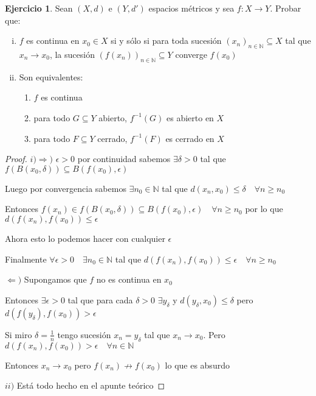 \documentclass[12pt]{article}
\newcommand{\N}{\mathbb{N}}
\newcommand{\Ra}{\Rightarrow}
\newcommand{\ra}{\rightarrow}
\theoremstyle{definition}
\newtheorem{ej}{Ejercicio}
\begin{document}
\begin{ej}
  Sean $(X,d)$ e $(Y,d')$ espacios métricos y sea $f: X \ra Y$. Probar que:
  \begin{enumerate}[i.]
    \item $f$ es continua en $x_0 \in X$ si y sólo si para toda sucesión $(x_n)_{n \in \N} \subseteq X$ tal que $x_n \ra x_0$, la sucesión $(f(x_n))_{n \in \N} \subseteq Y$ converge $f(x_0)$
    \item Son equivalentes:
      \begin{enumerate}
	\item $f$ es continua
	\item para todo $G \subseteq Y$ abierto, $f^{-1}(G)$ es abierto en $X$
	\item para todo $F \subseteq Y$ cerrado, $f^{-1}(F)$ es cerrado en $X$
      \end{enumerate}
  \end{enumerate}
  \begin{proof}
$i) \Ra)$ $\epsilon >0$ por continuidad sabemos $\exists \delta >0$ tal que $f(B(x_0,\delta)) \subseteq B(f(x_0),\epsilon)$

  Luego por convergencia sabemos $\exists n_0 \in \N$ tal que $d(x_n,x_0) \leq \delta \quad \forall n \geq n_0$ 

  Entonces $f(x_n) \in f(B(x_0,\delta)) \subseteq B(f(x_0),\epsilon) \quad \forall n \geq n_0$ por lo que $d(f(x_n),f(x_0)) \leq \epsilon$ 

  Ahora esto lo podemos hacer con cualquier $\epsilon$

  Finalmente $\forall \epsilon >0 \quad \exists n_0 \in \N$ tal que $d(f(x_n),f(x_0))\leq \epsilon \quad \forall n \geq n_0$

$\Leftarrow )$ Supongamos que $f$ no es continua en $x_0$ 

Entonces $\exists \epsilon > 0$ tal que para cada $\delta > 0$ $\exists y_{\delta}$ y $d(y_{\delta},x_0) \leq \delta$ pero $ d(f(y_{\delta}),f(x_0)) > \epsilon $

Si miro $\delta = \frac{1}{n}$ tengo sucesión $x_n = y_{\delta}$ tal que $x_n \ra x_0$. Pero $d(f(x_n),f(x_0)) > \epsilon \quad \forall n \in \N$

Entonces $x_n \ra x_0$ pero $f(x_n) \not\ra f(x_0)$ lo que es absurdo

$ii)$ Está todo hecho en el apunte teórico
  \end{proof}
\end{ej}
\end{document}

